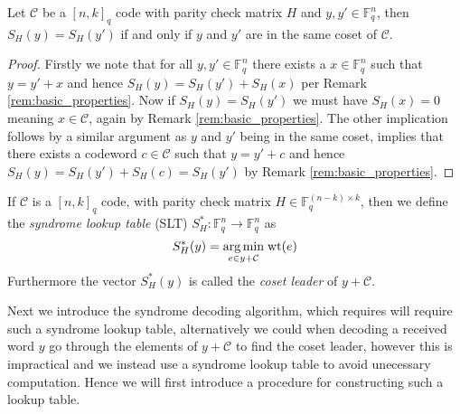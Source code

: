 \begin{lemma}\label{lem:syndrome_is_the_same_iff_they_are_in_the_same_coset}
  Let $\mathcal{C}$ be a $[n, k]_{q}$ code with parity check matrix $H$ and $y, y' \in \mathbb{F}_q^{n}$, then $S_H(y)=S_H(y')$ if and only if $y$ and $y'$ are in the same coset of $\mathcal{C}$.
\end{lemma}

\begin{proof}
  Firstly we note that for all $y, y' \in \mathbb{F}_q^n$ there exists a $x \in \mathbb{F}_q^n$ such that $y = y' + x$ and hence $S_H(y) = S_H(y') + S_H(x)$ per Remark \ref{rem:basic_properties}. Now if $S_H(y) = S_H(y')$ we must have $S_H(x) = 0$ meaning $x \in \mathcal{C}$, again by Remark \ref{rem:basic_properties}. The other implication follows by a similar argument as $y$ and $y'$ being in the same coset, implies that there exists a codeword $c \in \mathcal{C}$ such that $y = y' + c$ and hence $S_H(y) = S_H(y') + S_H(c) = S_H(y')$ by Remark \ref{rem:basic_properties}.
\end{proof}

\begin{definition}\label{def:syndrome_lookup_table}
  If $\mathcal{C}$ is a $[n, k]_q$ code, with parity check matrix $H \in \mathbb{F}_q^{(n - k) \times k}$, then we define the \textit{syndrome lookup table} (SLT) $S^{*}_H: \mathbb{F}_q^n \to \mathbb{F}_q^n$ as
  \begin{equation*}
    S_{H}^{*}(y) = \underset{e \in y + \mathcal{C}}{\arg \min} \; \mathrm{wt}(e)
  \end{equation*}
  Furthermore the vector $S_H^{*}(y)$ is called the \textit{coset leader} of $y + \mathcal{C}$.
\end{definition}

Next we introduce the syndrome decoding algorithm, which requires will require such a syndrome lookup table, alternatively we could when decoding a received word $y$ go through the elements of $y + \mathcal{C}$ to find the coset leader, however this is impractical and we instead use a syndrome lookup table to avoid unecessary computation. Hence we will first introduce a procedure for constructing such a lookup table.

